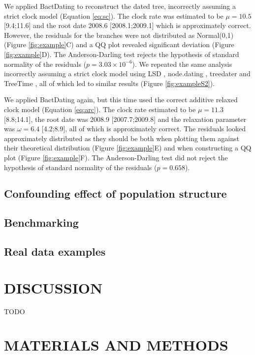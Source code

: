 \documentclass{article}
\begin{document}
We applied BactDating \citep{Didelot2018} to reconstruct the dated tree, 
incorrectly assuming a strict clock model (Equation \ref{eq:sc}).
The clock rate was estimated to be $\mu=10.5$ [9.4;11.6] and the root date 
2008.6 [2008.1;2009.1] which is approximately correct.
However, the residuals for the branches were not distributed as Normal(0,1) (Figure \ref{fig:example}C)
and a QQ plot revealed significant deviation (Figure \ref{fig:example}D). 
The Anderson-Darling test rejects the hypothesis of standard normality of the residuals ($p=3.03\times10^{-6}$).
We repeated the same analysis incorrectly assuming a strict clock model using 
LSD \citep{To2016}, node.dating \citep{Jones2017}, treedater \citep{Volz2017} and TreeTime \citep{Sagulenko2018},
all of which led to similar results (Figure \ref{fig:exampleS2}). 

We applied BactDating again, but this time used the correct additive relaxed clock model (Equation \ref{eq:arc}). 
The clock rate estimated to be $\mu=11.3$ [8.8;14.1], the root date was 2008.9 [2007.7;2009.8]
and the relaxation parameter was $\omega=6.4$ [4.2;8.9], all of which is approximately correct.
The residuals looked approximately distributed as they should be both when plotting them against
their theoretical distribution (Figure \ref{fig:example}E) and when constructing a QQ plot (Figure \ref{fig:example}F).
The Anderson-Darling test did not reject the hypothesis of standard normality of the residuals ($p=0.658$).

\subsection*{Confounding effect of population structure}

\subsection*{Benchmarking}

\subsection*{Real data examples}

\section*{DISCUSSION}

TODO

\section*{MATERIALS AND METHODS}
\end{document}
